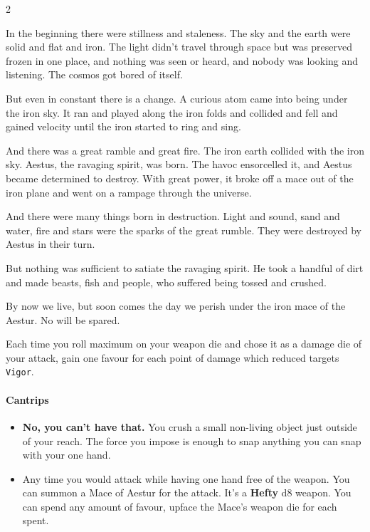 

\begin{multicols*}{2}

In the beginning there were stillness and staleness. The sky and the earth were solid and flat and iron. The light didn't travel through space but was preserved frozen in one place, and nothing was seen or heard, and nobody was looking and listening. The cosmos got bored of itself.

But even in constant there is a change. A curious atom came into being under the iron sky. It ran and played along the iron folds and collided and fell and gained velocity until the iron started to ring and sing.

And there was a great ramble and great fire. The iron earth collided with the iron sky. Aestus, the ravaging spirit, was born. The havoc ensorcelled it, and Aestus became determined to destroy. With great power, it broke off a mace out of the iron plane and went on a rampage through the universe.

And there were many things born in destruction. Light and sound, sand and water, fire and stars were the sparks of the great rumble. They were destroyed by Aestus in their turn.

But nothing was sufficient to satiate the ravaging spirit. He took a handful of dirt and made beasts, fish and people, who suffered being tossed and crushed.

By now we live, but soon comes the day we perish under the iron mace of the Aestur. No will be spared.

Each time you roll maximum on your weapon die and chose it as a damage die of your attack, gain one favour for each point of damage which reduced targets \texttt{Vigor}.

\paragraph{Cantrips}
\begin{itemize}[nosep, leftmargin=*]
    \item[\ding{108}] \textbf{No, you can't have that.} You crush a small non-living object just outside of your reach. The force you impose is enough to snap anything you can snap with your one hand.
    \item[\ding{108}] Any time you would attack while having one hand free of the weapon. You can summon a Mace of Aestur for the attack. It's a \textbf{Hefty} d8 weapon. 
    You can spend any amount of favour, upface the Mace's weapon die for each spent.
\end{itemize}


\end{multicols*}
